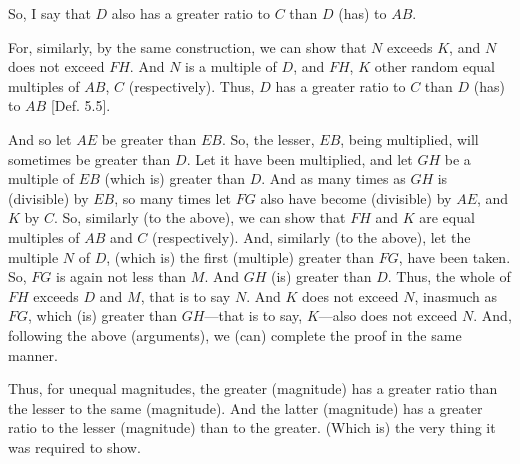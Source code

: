 \begin{Parallel}{}{}
{So, I say that $D$ also has a greater ratio to $C$ than $D$ (has) to $AB$.

For, similarly, by the same construction, we can show that 
$N$ exceeds $K$, and $N$ does not exceed $FH$. And $N$ is a multiple of $D$,
and $FH$, $K$ other  random  equal multiples of $AB$, $C$ (respectively). Thus, $D$ has a greater
ratio to  $C$ than $D$ (has) to $AB$ [Def. 5.5].

And so let $AE$ be greater than $EB$. So, the lesser, $EB$, being multiplied, will
sometimes be greater than $D$. Let it have been multiplied, and let $GH$ be
a multiple of $EB$ (which is) greater than $D$. And as many times as $GH$ is
(divisible) by $EB$, so many times let $FG$ also have become (divisible) by $AE$,
and $K$ by $C$. So, similarly (to the above), we can show that $FH$ and $K$ are equal multiples of
$AB$ and $C$ (respectively). And, similarly (to the above), let the multiple $N$ of $D$,  (which is)
the first (multiple) greater than $FG$, have been taken. So,  $FG$ is again not less than $M$.
And $GH$ (is) greater than $D$. Thus, the whole of $FH$ exceeds $D$ and $M$, that is to say $N$.  And $K$ does not exceed $N$, inasmuch as $FG$, which (is) greater than
$GH$---that is to say, $K$---also does not exceed $N$. And, following the above (arguments), we  (can) complete the proof in the same manner.

Thus, for unequal magnitudes, the greater (magnitude) has a greater
ratio  than the lesser to the same (magnitude). And the latter (magnitude)
has a greater ratio to the lesser (magnitude) than to the greater. (Which is)
the very thing it was required to show.}
\end{Parallel}

